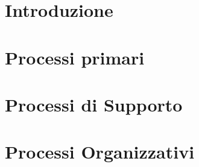 \documentclass[]{article}
\begin{document}
	
	\newpage

	\section{Introduzione}
	
	\newpage

	\section{Processi primari}
	
	\newpage

	
	\newpage

	\section{Processi di Supporto}
	
	\newpage

	
	\newpage

	
	\newpage

	
	\newpage

	
	\newpage

	\section{Processi Organizzativi}
	
	\newpage

	
	\newpage
\end{document}
